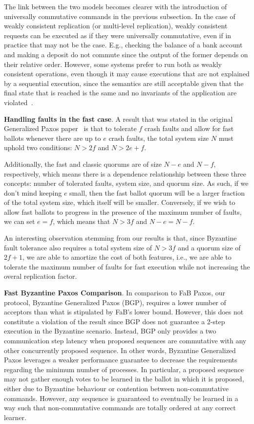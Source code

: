 The link between the two models becomes clearer with the introduction of 
universally commutative commands in the previous subsection.
In the case of weakly consistent replication (or multi-level replication),
weakly consistent requests can be executed as if they were universally
commutative, even if in practice that may not be the case. E.g., checking 
the balance of a bank account and making a deposit do not commute since
the output of the former depends on their relative order. However,
some systems prefer to run both as weakly consistent operations, even
though it may cause executions that are not explained by a sequential
execution, since the semantics are still acceptable given
that the final state that is reached is the same and no invariants 
of the application are violated~\cite{Li2012}.

\noindent \textbf{Handling faults in the fast case}.
A result that was stated in the original Generalized Paxos
paper~\cite{Lamport2005} is that to tolerate $f$ crash faults and
allow for fast ballots whenever there are up to $e$ crash faults, the
total system size $N$ must uphold two conditions:
$N > 2f$ and $N > 2e+f$.

Additionally, the fast and classic quorums are of size $N-e$ and $N-f$, respectively, which means there is a dependence relationship between these three concepts: number of tolerated faults, system size, and quorum size. As such, if we don't mind keeping $e$ small, then the fast ballot quorum will be a larger fraction of the total system size, which itself will be smaller. Conversely, if we wish to allow fast ballots to progress in the presence of the maximum number of faults, we can set $e=f$, which means that $N >3f$ and $N-e=N-f$. 


An interesting observation stemming from our results is that, since Byzantine fault tolerance also requires a total system size of $N>3f$ and a quorum size of $2f+1$, we are able to amortize the cost of both features, i.e., we are able to tolerate the maximum number of faults for fast execution while not increasing the overal replication factor.

\noindent \textbf{Fast Byzantine Paxos Comparison}.
In comparison to FaB Paxos, our protocol, Byzantine Generalized Paxos (BGP), requires a lower number of acceptors than what is stipulated by FaB's lower bound. However, this does not constitute a violation of the result since BGP does not guarantee a 2-step execution in the Byzantine scenario. Instead, BGP only provides a two communication step latency when proposed sequences are commutative with any other concurrently proposed sequence. In other words, Byzantine Generalized Paxos leverages a weaker performance guarantee to decrease the requirements regarding the minimum number of processes. In particular, a proposed sequence may not gather enough votes to be learned in the ballot in which it is proposed, either due to Byzantine behaviour or contention between non-commutative commands. However, any sequence is guaranteed to eventually be learned in a way such that non-commutative commands are totally ordered at any correct learner.